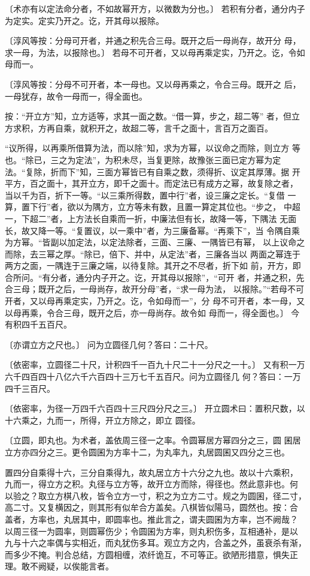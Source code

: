 \documentclass[a4paper,12pt,UTF8,twoside]{ctexbook}
\begin{document}
〔术亦有以定法命分者，不如故幂开方，以微数为分也。〕 若积有分者，通分内子为定实。定实乃开之。讫，开其母以报除。

〔淳风等按：分母可开者，并通之积先合三母。既开之后一母尚存，故开分 母，求一母，为法，以报除也。〕 若母不可开者，又以母再乘定实，乃开之。讫，令如母而一。

〔淳风等按：分母不可开者，本一母也。又以母再乘之，令合三母。既开之 后，一母犹存，故令一母而一，得全面也。

按：“开立方”知，立方适等，求其一面之数。“借一算，步之，超二等” 者，但立方求积，方再自乘，就积开之，故超二等，言千之面十，言百万之面百。

“议所得，以再乘所借算为法，而以除”知，求为方幂，以议命之而除，则立方 等也。“除已，三之为定法”，为积未尽，当复更除，故豫张三面已定方幂为定 法。“复除，折而下”知，三面方幂皆已有自乘之数，须得折、议定其厚薄。据 开平方，百之面十，其开立方，即千之面十。而定法已有成方之幂，故复除之者， 当以千为百，折下一等。“以三乘所得数，置中行”者，设三廉之定长。“复借 一算，置下行”者，欲以为隅方，立方等未有数，且置一算定其位也。“步之， 中超一，下超二”者，上方法长自乘而一折，中廉法但有长，故降一等，下隅法 无面长，故又降一等。“复置议，以一乘中”者，为三廉备幂。“再乘下”，当 令隅自乘为方幂。“皆副以加定法，以定法除者，三面、三廉、一隅皆已有幂， 以上议命之而除，去三幂之厚。“除已，倍下、并中，从定法”者，三廉各当以 两面之幂连于两方之面，一隅连于三廉之端，以待复除。其开之不尽者，折下如 前，开方，即合所问。“有分者，通分内子开之。讫，开其母以报除”，“可开 者，并通之积，先合三母；既开之后，一母尚存，故开分母”者，“求一母为法， 以报除。”“若母不可开者，又以母再乘定实，乃开之。讫，令如母而一”，分 母不可开者，本一母，又以母再乘，令合三母，既开之后，亦一母尚存。故令如 母而一，得全面也。〕 今有积四千五百尺。

〔亦谓立方之尺也。〕 问为立圆径几何？答曰：二十尺。

〔依密率，立圆径二十尺，计积四千一百九十尺二十一分尺之一十。〕 又有积一万六千四百四十八亿六千六百四十三万七千五百尺。问为立圆径几 何？答曰：一万四千三百尺。

〔依密率，为径一万四千六百四十三尺四分尺之三。〕 开立圆术曰：置积尺数，以十六乘之，九而一，所得，开立方除之，即立 圆径。

〔立圆，即丸也。为术者，盖依周三径一之率。令圆幂居方幂四分之三，圆 囷居立方亦四分之三。更令圆囷为方率十二，为丸率九，丸居圆囷又四分之三也。

置四分自乘得十六，三分自乘得九，故丸居立方十六分之九也。故以十六乘积， 九而一，得立方之积。丸径与立方等，故开立方而除，得径也。然此意非也。何 以验之？取立方棋八枚，皆令立方一寸，积之为立方二寸。规之为圆囷，径二寸， 高二寸。又复横因之，则其形有似牟合方盖矣。八棋皆似陽马，圆然也。按：合 盖者，方率也，丸居其中，即圆率也。推此言之，谓夫圆囷为方率，岂不阙哉？ 以周三径一为圆率，则圆幂伤少；令圆囷为方率，则丸积伤多，互相通补，是以 九与十六之率偶与实相近，而丸犹伤多耳。观立方之内，合盖之外，虽衰杀有渐， 而多少不掩。判合总结，方圆相缠，浓纤诡互，不可等正。欲陋形措意，惧失正 理。敢不阙疑，以俟能言者。
\end{document}
